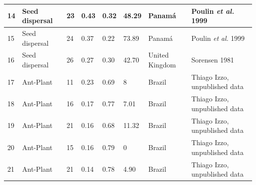\documentclass[a4paper, 12pt]{article}
\begin{document}
\begin{table}[H]
\begin{adjustbox}{width=\columnwidth,center}
{\begin{tabular}{|l|l|l|l|l|l|l|l|}
14                                 & Seed dispersal                     & 23                              & 0.43                            & 0.32                            & 48.29                              & Panamá                                 & Poulin \textit{et al.} 1999                              \\ \hline
15                                 & Seed dispersal                     & 24                              & 0.37                            & 0.22                            & 73.89                              & Panamá                                 &Poulin \textit{et al.} 1999                              \\ \hline
16                                 & Seed dispersal                     & 26                              & 0.27                            & 0.30                            & 42.70                              & United Kingdom                         &Sorensen 1981                                  \\ \hline
17                                 & Ant-Plant                          & 11                              & 0.23                            & 0.69                            & 8                                  & Brazil                                 & Thiago Izzo, unpublished data                   \\ \hline
18                                 & Ant-Plant                          & 16                              & 0.17                            & 0.77                            & 7.01                               & Brazil                                 & Thiago Izzo, unpublished data                   \\ \hline
19                                 & Ant-Plant                          & 21                              & 0.16                            & 0.68                            & 11.32                              & Brazil                                 & Thiago Izzo, unpublished data                   \\ \hline
20                                 & Ant-Plant                          & 15                              & 0.16                            & 0.79                            & 0                                  & Brazil                                 & Thiago Izzo, unpublished data                   \\ \hline
21                                 & Ant-Plant                          & 21                              & 0.14                            & 0.78                            & 4.90                               & Brazil                                 & Thiago Izzo, unpublished data                   \\ \hline

\end{tabular}}
\end{adjustbox}
\end{table}
\end{document}
